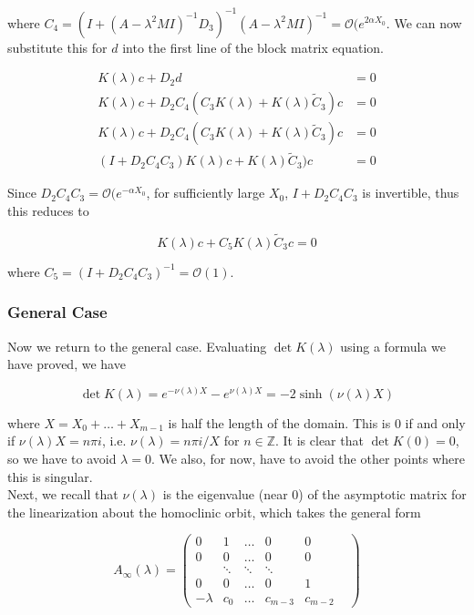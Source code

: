 \documentclass[12pt]{article}
\def\Z{{\mathbb Z}}
\begin{document}
where $C_4 = (I + (A - \lambda^2 MI)^{-1} D_3)^{-1}(A - \lambda^2 MI)^{-1} = \mathcal{O}(e^{2 \alpha X_0}$. We can now substitute this for $d$ into the first line of the block matrix equation.

\begin{align*}
K(\lambda)c + D_2 d &= 0 \\
K(\lambda)c + D_2 C_4 (C_3 K(\lambda) + K(\lambda) \tilde{C}_3) c &= 0 \\
K(\lambda)c + D_2 C_4 (C_3 K(\lambda) + K(\lambda) \tilde{C}_3) c &= 0 \\
(I + D_2 C_4 C_3 ) K(\lambda)c + K(\lambda) \tilde{C}_3) c &= 0
\end{align*}

Since $D_2 C_4 C_3 = \mathcal{O}(e^{-\alpha X_0}$, for sufficiently large $X_0$, $I + D_2 C_4 C_3$ is invertible, thus this reduces to

\[
K(\lambda)c + C_5 K(\lambda) \tilde{C}_3 c = 0
\]

where $C_5 = (I + D_2 C_4 C_3)^{-1} = \mathcal{O}(1)$. 



\subsubsection{General Case}

Now we return to the general case. Evaluating $\det K(\lambda)$ using a formula we have proved, we have

\[
\det K(\lambda) = e^{-\nu(\lambda)X} - e^{\nu(\lambda)X} = -2 \sinh(\nu(\lambda) X)
\]

where $X = X_0 + \dots + X_{m-1}$ is half the length of the domain. This is 0 if and only if $\nu(\lambda)X = n \pi i$, i.e. $\nu(\lambda) = n \pi i / X$ for $n \in \Z$. It is clear that $\det K(0) = 0$, so we have to avoid $\lambda = 0$. We also, for now, have to avoid the other points where this is singular.
\\

Next, we recall that $\nu(\lambda)$ is the eigenvalue (near 0) of the asymptotic matrix for the linearization about the homoclinic orbit, which takes the general form 

\begin{equation}
A_\infty(\lambda) = \begin{pmatrix}
0 & 1 & \dots & 0 & 0 \\
0 & 0 & \dots & 0 & 0 \\
& \ddots & \ddots & \ddots & & \\
0 & 0 & \dots & 0 & 1 \\
-\lambda & c_0 & \dots & c_{m-3} & c_{m-2}
\end{pmatrix}
\end{equation}
\end{document}
